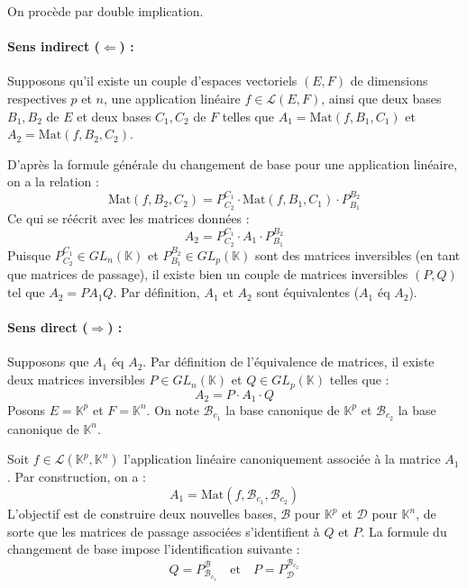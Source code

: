 \documentclass[11pt, a4paper]{article}
\theoremstyle{definition}
\begin{document}
On procède par double implication.

\paragraph{Sens indirect ($\Leftarrow$) : }
Supposons qu'il existe un couple d'espaces vectoriels $(E,F)$ de dimensions respectives $p$ et $n$, une application linéaire $f \in \mathcal{L}(E,F)$, ainsi que deux bases $B_1, B_2$ de $E$ et deux bases $C_1, C_2$ de $F$ telles que $A_1 = \mathrm{Mat}(f, B_1, C_1)$ et $A_2 = \mathrm{Mat}(f, B_2, C_2)$.

D'après la formule générale du changement de base pour une application linéaire, on a la relation :
\[
\mathrm{Mat}(f, B_2, C_2) = P_{C_2}^{C_1} \cdot \mathrm{Mat}(f, B_1, C_1) \cdot P_{B_1}^{B_2}
\]
Ce qui se réécrit avec les matrices données :
\[
A_2 = P_{C_2}^{C_1} \cdot A_1 \cdot P_{B_1}^{B_2}
\]
Puisque $P_{C_2}^{C_1} \in GL_n(\mathbb{K})$ et $P_{B_1}^{B_2} \in GL_p(\mathbb{K})$ sont des matrices inversibles (en tant que matrices de passage), il existe bien un couple de matrices inversibles $(P, Q)$ tel que $A_2 = P A_1 Q$. Par définition, $A_1$ et $A_2$ sont équivalentes ($A_1 \text{ éq } A_2$).

\paragraph{Sens direct ($\Rightarrow$) : }
Supposons que $A_1 \text{ éq } A_2$. Par définition de l'équivalence de matrices, il existe deux matrices inversibles $P \in GL_n(\mathbb{K})$ et $Q \in GL_p(\mathbb{K})$ telles que :
\[
A_2 = P \cdot A_1 \cdot Q
\]
Posons $E = \mathbb{K}^p$ et $F = \mathbb{K}^n$. On note $\mathcal{B}_{c_1}$ la base canonique de $\mathbb{K}^p$ et $\mathcal{B}_{c_2}$ la base canonique de $\mathbb{K}^n$.

Soit $f \in \mathcal{L}(\mathbb{K}^p, \mathbb{K}^n)$ l'application linéaire canoniquement associée à la matrice $A_1$. Par construction, on a :
\[
A_1 = \mathrm{Mat}(f, \mathcal{B}_{c_1}, \mathcal{B}_{c_2})
\]
L'objectif est de construire deux nouvelles bases, $\mathcal{B}$ pour $\mathbb{K}^p$ et $\mathcal{D}$ pour $\mathbb{K}^n$, de sorte que les matrices de passage associées s'identifient à $Q$ et $P$. La formule du changement de base impose l'identification suivante :
\[
Q = P_{\mathcal{B}_{c_1}}^{\mathcal{B}} \quad \text{et} \quad P = P_{\mathcal{D}}^{\mathcal{B}_{c_2}}
\]
\end{document}
